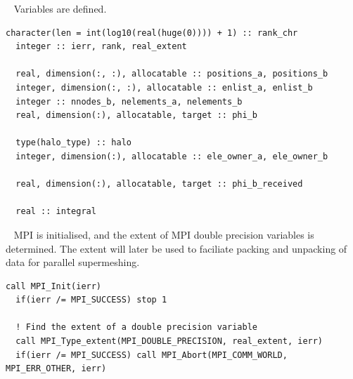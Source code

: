 \documentclass{article}
\begin{document}
~\newline
Variables are defined.
\begin{lstlisting}[language=FORTRAN]
  character(len = int(log10(real(huge(0)))) + 1) :: rank_chr
  integer :: ierr, rank, real_extent
  
  real, dimension(:, :), allocatable :: positions_a, positions_b
  integer, dimension(:, :), allocatable :: enlist_a, enlist_b
  integer :: nnodes_b, nelements_a, nelements_b
  real, dimension(:), allocatable, target :: phi_b
  
  type(halo_type) :: halo
  integer, dimension(:), allocatable :: ele_owner_a, ele_owner_b
  
  real, dimension(:), allocatable, target :: phi_b_received
  
  real :: integral
\end{lstlisting}

~\newline
MPI is initialised, and the extent of MPI double precision variables is
determined. The extent will later be used to faciliate packing and unpacking of
data for parallel supermeshing.
\begin{lstlisting}[language=FORTRAN]
  call MPI_Init(ierr)
  if(ierr /= MPI_SUCCESS) stop 1
  
  ! Find the extent of a double precision variable
  call MPI_Type_extent(MPI_DOUBLE_PRECISION, real_extent, ierr)
  if(ierr /= MPI_SUCCESS) call MPI_Abort(MPI_COMM_WORLD, MPI_ERR_OTHER, ierr)
\end{lstlisting}
\end{document}
